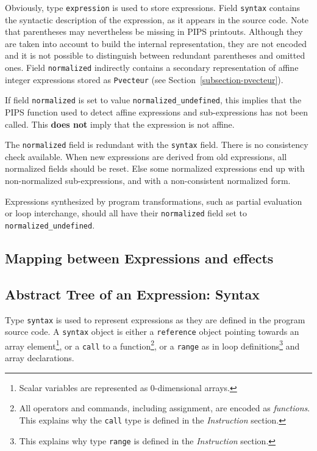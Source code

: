 \documentclass[a4paper]{article}
\begin{document}
{}

Obviously, type \verb/expression/ is used to store expressions. Field
\verb/syntax/ contains the syntactic description of the expression, as
it appears in the source code. Note that parentheses may nevertheless be
missing in PIPS printouts. Although they are taken into account
to build the internal representation, they are not encoded and it is not
possible to distinguish between redundant parentheses and omitted
ones. Field \verb/normalized/ indirectly contains a secondary
representation of affine integer expressions stored as
\verb/Pvecteur/ (see Section~\ref{subsection-pvecteur}).

If field \texttt{normalized} is set to value
\texttt{normalized\_undefined}, this implies that the PIPS function used to
detect affine expressions and sub-expressions has not been called. This
{\bf does not} imply that the expression is not affine.

The \verb/normalized/ field is redundant with the \verb/syntax/
field. There is no consistency check available. When new expressions are
derived from old expressions, all normalized fields should be
reset. Else some normalized expressions end up with non-normalized
sub-expressions, and with a non-consistent normalized form.

Expressions synthesized by program transformations, such as partial
evaluation or loop interchange, should all have their \texttt{normalized}
field set to \texttt{normalized\_undefined}.


\subsection{Mapping between Expressions and effects}



\subsection{Abstract Tree of an Expression: Syntax}
\label{subsection-syntax}

{}

Type \verb/syntax/ is used to represent expressions as they are
defined in the program source code. A \verb/syntax/ object is either a
\verb/reference/ object pointing towards an array
element\footnote{Scalar variables are represented as 0-dimensional
  arrays.}, or a \verb/call/ to a function\footnote{All operators and
  commands, including assignment, are encoded as \emph{functions}. This
  explains why the \texttt{call} type is defined in the
  \emph{Instruction} section.}, or a \verb/range/ as in loop
definitions\footnote{This explains why type \texttt{range} is defined
  in the \emph{Instruction} section.} and array declarations.
\end{document}
